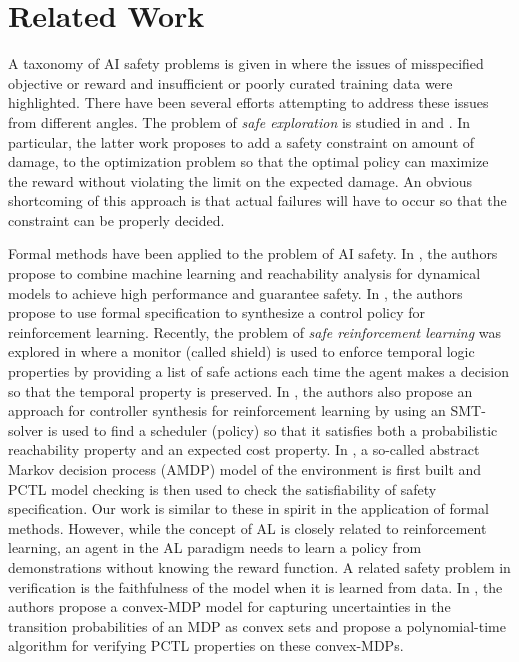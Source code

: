 \section{Related Work}
A taxonomy of AI safety problems is given in \cite{AmodeiOSCSM16} where the issues of misspecified objective or reward and insufficient or poorly curated training data were highlighted. There have been several efforts attempting to address these issues from different angles. The problem of {\it safe exploration} is studied in \cite{moldovan2012safe} and \cite{DBLP:journals/corr/HeldMZSA17}. In particular, the latter work proposes to add a safety constraint on amount of damage, to the optimization problem so that the optimal policy can maximize the reward without violating the limit on the expected damage. An obvious shortcoming of this approach is that actual failures will have to occur so that the constraint can be properly decided.

Formal methods have been applied to the problem of AI safety. 
In \cite{gillulay2011guaranteed}, the authors propose to combine machine learning and reachability analysis for dynamical models to achieve high performance and guarantee safety. In \cite{DBLP:journals/corr/SadighKCSS14}, the authors propose to use formal specification to synthesize a control policy for reinforcement learning. Recently, the problem of {\it safe reinforcement learning} was explored in \cite{DBLP:journals/corr/abs-1708-08611} where a monitor (called shield) is used to enforce temporal logic properties by providing a list of safe actions each time the agent makes a decision so that the temporal property is preserved. 
In \cite{junges2016safety}, the authors also propose an approach for controller synthesis for reinforcement learning by using an SMT-solver is used to find a scheduler (policy) so that it satisfies both a probabilistic reachability property and an expected cost property. 
In \cite{mason2017assured}, a so-called abstract Markov decision process (AMDP) model of the environment is first built and PCTL model checking is then used to check the satisfiability of safety specification.
Our work is similar to these in spirit in the application of formal methods. However, while the concept of AL is closely related to reinforcement learning, an agent in the AL paradigm needs to learn a policy from demonstrations without knowing the reward function.
A related safety problem in verification is the faithfulness of the model when it is learned from data. 
In \cite{puggelli-cav13}, the authors propose a convex-MDP model for capturing uncertainties in the transition probabilities of an MDP as convex sets and propose a polynomial-time algorithm for verifying PCTL properties on these convex-MDPs. 

